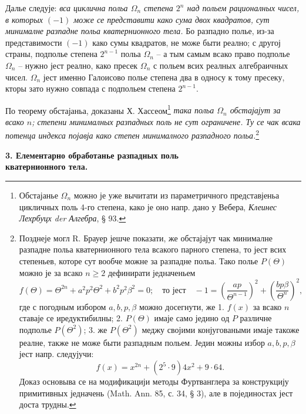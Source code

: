 ﻿\documentclass[11pt]{article}
\begin{document}
\noindent Далье следује: \emph{вса циклична польа $\Omega_n$ степена $2^n$ над польем рационалных чисел, в которых $(-1)$ може се представити како сума двох квадратов, сут минималне разпадне польа кватернионного тела.} Бо разпадно полье, из-за представимости $(-1)$ како сумы квадратов, не може быти реално; с другој страны, подполье степена $2^{n-1}$ польа $\Omega_n$ -- а тым самым всако право подполье $\Omega_n$ -- нужно јест реално, како пресек $\Omega_n$ с польем всих реалных алгебраичных чисел. $\Omega_n$ јест именно Галоисово полье степена два в односу к тому пресеку, кторы зато нужно совпада с подпольем степена $2^{n-1}$.

\medskip

\noindent По теорему обстајаньа, доказаны Х. Хассеом\footnote{Обстајанье $\Omega_n$ можно је уже вычитати из параметричного представјеньа цикличных поль 4-го степена, како је оно напр. дано у Вебера, \emph{Клеинес Лехрбуцх der Алгебра}, § 93.} \emph{така польа $\Omega_n$ обстајајут за всако $n$; степени минималных разпадных поль не сут ограничене. Ту се чак всака потенца индекса појавја како степен минималного разпадного польа.}\footnote{Позднеје могл R. Брауер јешче показати, же обстајајут чак минималне разпадне польа кватернионного тела всакого парного степена, то јест всих степеньев, которе сут вообче можне за разпадне польа. Тако полье $P(\Theta)$ можно је за всако $n\ge2$ дефинирати једначеньем
\[
 f(\Theta)=\Theta^{2n}+a^2p^2\Theta^2+b^2p^2\beta^2=0;
 \quad \text{то јест}\quad -1=\left(\frac{ap}{\Theta^{n-1}}\right)^2+
       \left(\frac{bp\beta}{\Theta^n}\right)^2,
\]
где с погодным избором $a,b,p,\beta$ можно досегнути, же 1. $f(x)$ за всако $n$ ставаје се иредуктибилны; 2. $P(\Theta)$ имаје само једино од $P$ различне подполье $P(\Theta^2)$; 3. же $P(\Theta^2)$ меджу својими конјуговаными имаје такоже реалне, также не може быти разпадным польем. Једин можны избор $a,b,p,\beta$ јест напр. следујучи:
\[
        f(x)=x^{2n}+(2^5\cdot9)4x^2+9\cdot64.
\]
Доказ основыва се на модификацији методы Фуртванглера за конструкцију примитивных једначень (Math. Ann. 85, с. 34, § 3), але в појединостах јест доста трудны.}

\begin{center}
\textbf{3. Елементарно обработанье разпадных поль\\
кватернионного тела.}
\end{center}
\end{document}
